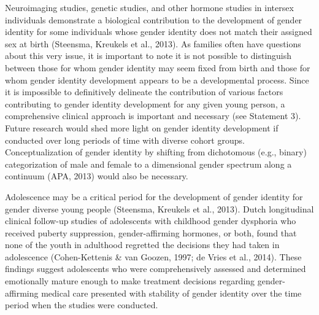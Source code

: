 \documentclass[
]{book}
\begin{document}
Neuroimaging studies, genetic studies, and
other hormone studies in intersex individuals
demonstrate a biological contribution to the
development of gender identity for some
individuals whose gender identity does not match
their assigned sex at birth (Steensma, Kreukels
et al., 2013). As families often have questions
about this very issue, it is important to note it
is not possible to distinguish between those for
whom gender identity may seem fixed from birth
and those for whom gender identity development
appears to be a developmental process. Since it
is impossible to definitively delineate the contribution of various factors contributing to gender
identity development for any given young person,
a comprehensive clinical approach is important
and necessary (see Statement 3). Future research
would shed more light on gender identity development if conducted over long periods of time
with diverse cohort groups. Conceptualization of
gender identity by shifting from dichotomous
(e.g., binary) categorization of male and female
to a dimensional gender spectrum along a continuum (APA, 2013) would also be necessary.

Adolescence may be a critical period for the
development of gender identity for gender diverse
young people (Steensma, Kreukels et al., 2013).
Dutch longitudinal clinical follow-up studies of
adolescents with childhood gender dysphoria who
received puberty suppression, gender-affirming
hormones, or both, found that none of the youth
in adulthood regretted the decisions they had
taken in adolescence (Cohen-Kettenis \& van
Goozen, 1997; de Vries et al., 2014). These findings suggest adolescents who were comprehensively assessed and determined emotionally
mature enough to make treatment decisions
regarding gender- affirming medical care presented with stability of gender identity over the
time period when the studies were conducted.
\end{document}
